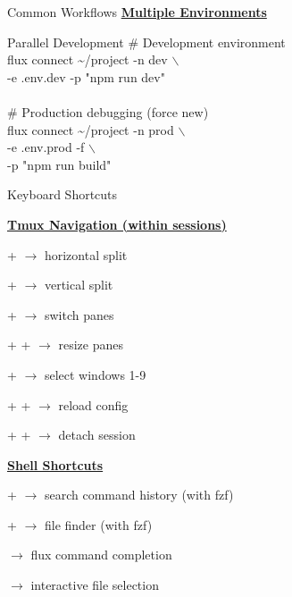 \documentclass[10pt,a4paper]{article}
\begin{document}
\begin{multicols}{3}
\begin{textbox}{Common Workflows}
\underline{\textbf{Multiple Environments}}

\begin{simplecodebox}{Parallel Development}
\# Development environment\\
flux connect \textasciitilde/project -n dev $\backslash$\\
\phantom{xx}-e .env.dev -p "npm run dev"\\
\\
\# Production debugging (force new)\\
flux connect \textasciitilde/project -n prod $\backslash$\\
\phantom{xx}-e .env.prod -f $\backslash$\\
\phantom{xx}-p "npm run build"\\
\end{simplecodebox}

\end{textbox}

\begin{textbox}{Keyboard Shortcuts}

\underline{\textbf{Tmux Navigation (within sessions)}}

 +  $\rightarrow$ horizontal split

 +  $\rightarrow$ vertical split

 +  $\rightarrow$ switch panes

 +  +  $\rightarrow$ resize panes

 +  $\rightarrow$ select windows 1-9

 +  +  $\rightarrow$ reload config

 +  +  $\rightarrow$ detach session

\underline{\textbf{Shell Shortcuts}}

 +  $\rightarrow$ search command history (with fzf)

 +  $\rightarrow$ file finder (with fzf)

 $\rightarrow$ flux command completion

  $\rightarrow$ interactive file selection

\end{textbox}


\end{multicols}
\end{document}
